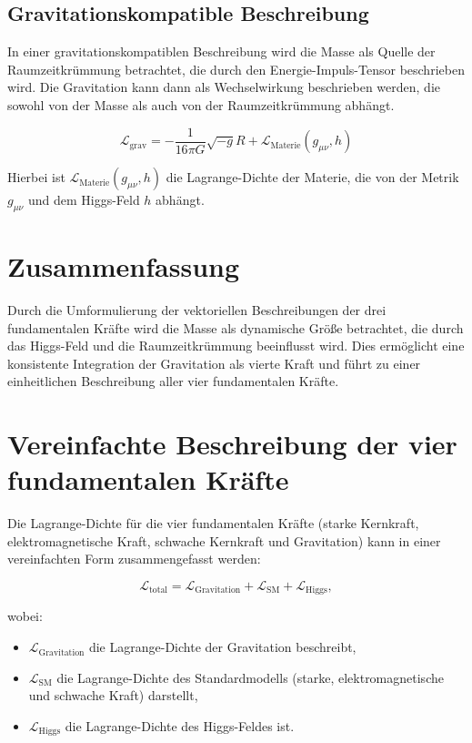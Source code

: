 \documentclass{article}
\begin{document}
	\subsection{Gravitationskompatible Beschreibung}
	In einer gravitationskompatiblen Beschreibung wird die Masse als Quelle der Raumzeitkrümmung betrachtet, die durch den Energie-Impuls-Tensor beschrieben wird. Die Gravitation kann dann als Wechselwirkung beschrieben werden, die sowohl von der Masse als auch von der Raumzeitkrümmung abhängt.
	
	\begin{equation}
		\mathcal{L}_\text{grav} = -\frac{1}{16\pi G} \sqrt{-g}R + \mathcal{L}_\text{Materie}(g_{\mu\nu}, h)
	\end{equation}
	
	Hierbei ist $\mathcal{L}_\text{Materie}(g_{\mu\nu}, h)$ die Lagrange-Dichte der Materie, die von der Metrik $g_{\mu\nu}$ und dem Higgs-Feld $h$ abhängt.
	
	\section{Zusammenfassung}
	
	Durch die Umformulierung der vektoriellen Beschreibungen der drei fundamentalen Kräfte wird die Masse als dynamische Größe betrachtet, die durch das Higgs-Feld und die Raumzeitkrümmung beeinflusst wird. Dies ermöglicht eine konsistente Integration der Gravitation als vierte Kraft und führt zu einer einheitlichen Beschreibung aller vier fundamentalen Kräfte.

	
	\section{Vereinfachte Beschreibung der vier fundamentalen Kräfte}
	
	Die Lagrange-Dichte für die vier fundamentalen Kräfte (starke Kernkraft, elektromagnetische Kraft, schwache Kernkraft und Gravitation) kann in einer vereinfachten Form zusammengefasst werden:
	
	\begin{equation}
		\mathcal{L}_\text{total} = \mathcal{L}_\text{Gravitation} + \mathcal{L}_\text{SM} + \mathcal{L}_\text{Higgs},
	\end{equation}
	
	wobei:
	\begin{itemize}
		\item $\mathcal{L}_\text{Gravitation}$ die Lagrange-Dichte der Gravitation beschreibt,
		\item $\mathcal{L}_\text{SM}$ die Lagrange-Dichte des Standardmodells (starke, elektromagnetische und schwache Kraft) darstellt,
		\item $\mathcal{L}_\text{Higgs}$ die Lagrange-Dichte des Higgs-Feldes ist.
	\end{itemize}
	
\end{document}
